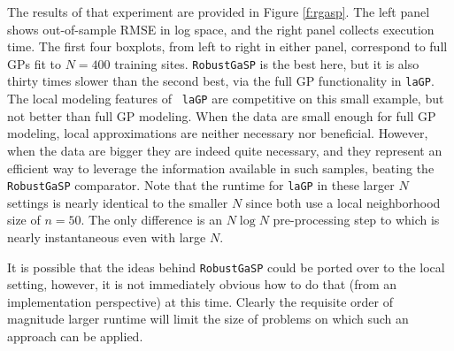 \documentclass[12pt]{article}
\begin{document}
The results of that experiment are provided in Figure \ref{f:rgasp}.  The left
panel shows out-of-sample RMSE in log space, and the right panel collects
execution time. The first four boxplots, from left to right in either panel,
correspond to full GPs fit to $N=400$ training sites.  {\tt RobustGaSP} is the
best here, but it is also thirty times slower than the second best, via the
full GP functionality in {\tt laGP}.  The local modeling features of {\tt
laGP} are competitive on this small example, but not better than full GP
modeling.  When the data are small enough for full GP modeling, local
approximations are neither necessary nor beneficial.  However, when the data
are bigger they are indeed quite necessary, and they represent an efficient way
to leverage the information available in such samples, beating the {\tt
RobustGaSP} comparator.  Note that the runtime for {\tt laGP} in these larger
$N$ settings is nearly identical to the smaller $N$ since both use a local
neighborhood size of $n=50$.  The only difference is an $N \log N$
pre-processing step to which is nearly instantaneous even with large $N$.

It is possible that the ideas behind {\tt RobustGaSP} could be ported over to
the local setting, however, it is not immediately obvious how to do that (from
an implementation perspective) at this time.  Clearly the requisite order of
magnitude larger runtime will limit the size of problems on which such an
approach can be applied.

\newpage



\end{document}
